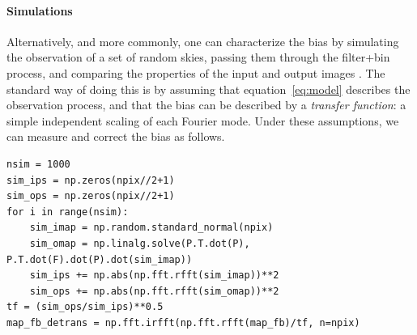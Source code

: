 \documentclass[twocolumn,apj]{aastex63}
\begin{document}
\paragraph{Simulations}
Alternatively, and more commonly, one can characterize the bias
by simulating the observation of a set of random skies, passing
them through the filter+bin process, and comparing the properties
of the input and output images \citep[e.g.][]{spt-bmodes-2020}. The standard way of doing this is
by assuming that equation~\ref{eq:model} describes the observation
process, and that the bias can be described by a \emph{transfer function}:
a simple independent scaling of each Fourier mode. Under
these assumptions, we can measure and correct the bias as follows.
\begin{lstlisting}
nsim = 1000
sim_ips = np.zeros(npix//2+1)
sim_ops = np.zeros(npix//2+1)
for i in range(nsim):
	sim_imap = np.random.standard_normal(npix)
	sim_omap = np.linalg.solve(P.T.dot(P), P.T.dot(F).dot(P).dot(sim_imap))
	sim_ips += np.abs(np.fft.rfft(sim_imap))**2
	sim_ops += np.abs(np.fft.rfft(sim_omap))**2
tf = (sim_ops/sim_ips)**0.5
map_fb_detrans = np.fft.irfft(np.fft.rfft(map_fb)/tf, n=npix)
\end{lstlisting}
\end{document}
